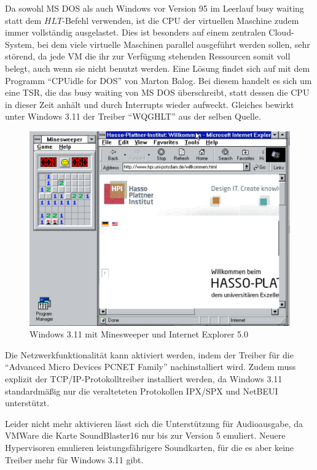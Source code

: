 	Da sowohl MS DOS als auch Windows vor Version 95 im Leerlauf busy waiting statt dem $HLT$-Befehl verwenden, ist die CPU der virtuellen Maschine zudem immer vollständig ausgelastet.
	Dies ist besonders auf einem zentralen Cloud-System, bei dem viele virtuelle Maschinen parallel ausgeführt werden sollen, sehr störend, da jede VM die ihr zur Verfügung stehenden Ressourcen somit voll belegt, auch wenn sie nicht benutzt werden.
	Eine Lösung findet sich auf \cite{VMDriver} mit dem Programm "`CPUidle for DOS"' von Marton Balog.
	Bei diesem handelt es sich um eine TSR, die das busy waiting von MS DOS überschreibt, statt dessen die CPU in dieser Zeit anhält und durch Interrupts wieder aufweckt.
	Gleiches bewirkt unter Windows 3.11 der Treiber "`WQGHLT"' aus der selben Quelle.

	\begin{figure}[h]
		\begin{center}
			\includegraphics[width=\textwidth]{img/win311screen}
			\caption{Windows 3.11 mit Minesweeper und Internet Explorer 5.0}
			\label{fig:screenshot-win311apps}
		\end{center}
	\end{figure}

	Die Netzwerkfunktionalität kann aktiviert werden, indem der Treiber für die "`Advanced Micro Devices PCNET Family"' nachinstalliert wird.
	Zudem muss explizit der TCP/IP-Protokolltreiber installiert werden, da Windows 3.11 standardmäßig nur die veralteteten Protokollen IPX/SPX und NetBEUI unterstützt.

	Leider nicht mehr aktivieren lässt sich die Unterstützung für Audioausgabe, da VMWare die Karte SoundBlaster16 nur bis zur Version 5 emuliert.
	Neuere Hypervisoren emulieren leistungsfährigere Soundkarten, für die es aber keine Treiber mehr für Windows 3.11 gibt.


